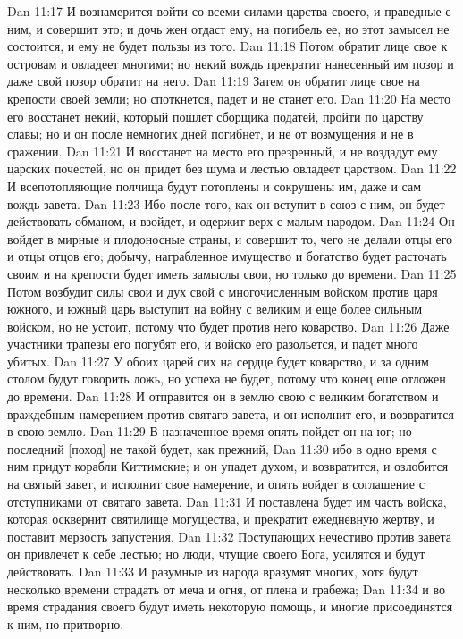 Dan 11:17  И вознамерится войти со всеми силами царства своего, и праведные с ним, и совершит это; и дочь жен отдаст ему, на погибель ее, но этот замысел не состоится, и ему не будет пользы из того.
Dan 11:18  Потом обратит лице свое к островам и овладеет многими; но некий вождь прекратит нанесенный им позор и даже свой позор обратит на него.
Dan 11:19  Затем он обратит лице свое на крепости своей земли; но споткнется, падет и не станет его.
Dan 11:20  На место его восстанет некий, который пошлет сборщика податей, пройти по царству славы; но и он после немногих дней погибнет, и не от возмущения и не в сражении.
Dan 11:21  И восстанет на место его презренный, и не воздадут ему царских почестей, но он придет без шума и лестью овладеет царством.
Dan 11:22  И всепотопляющие полчища будут потоплены и сокрушены им, даже и сам вождь завета.
Dan 11:23  Ибо после того, как он вступит в союз с ним, он будет действовать обманом, и взойдет, и одержит верх с малым народом.
Dan 11:24  Он войдет в мирные и плодоносные страны, и совершит то, чего не делали отцы его и отцы отцов его; добычу, награбленное имущество и богатство будет расточать своим и на крепости будет иметь замыслы свои, но только до времени.
Dan 11:25  Потом возбудит силы свои и дух свой с многочисленным войском против царя южного, и южный царь выступит на войну с великим и еще более сильным войском, но не устоит, потому что будет против него коварство.
Dan 11:26  Даже участники трапезы его погубят его, и войско его разольется, и падет много убитых.
Dan 11:27  У обоих царей сих на сердце будет коварство, и за одним столом будут говорить ложь, но успеха не будет, потому что конец еще отложен до времени.
Dan 11:28  И отправится он в землю свою с великим богатством и враждебным намерением против святаго завета, и он исполнит его, и возвратится в свою землю.
Dan 11:29  В назначенное время опять пойдет он на юг; но последний [поход] не такой будет, как прежний,
Dan 11:30  ибо в одно время с ним придут корабли Киттимские; и он упадет духом, и возвратится, и озлобится на святый завет, и исполнит свое намерение, и опять войдет в соглашение с отступниками от святаго завета.
Dan 11:31  И поставлена будет им часть войска, которая осквернит святилище могущества, и прекратит ежедневную жертву, и поставит мерзость запустения.
Dan 11:32  Поступающих нечестиво против завета он привлечет к себе лестью; но люди, чтущие своего Бога, усилятся и будут действовать.
Dan 11:33  И разумные из народа вразумят многих, хотя будут несколько времени страдать от меча и огня, от плена и грабежа;
Dan 11:34  и во время страдания своего будут иметь некоторую помощь, и многие присоединятся к ним, но притворно.
